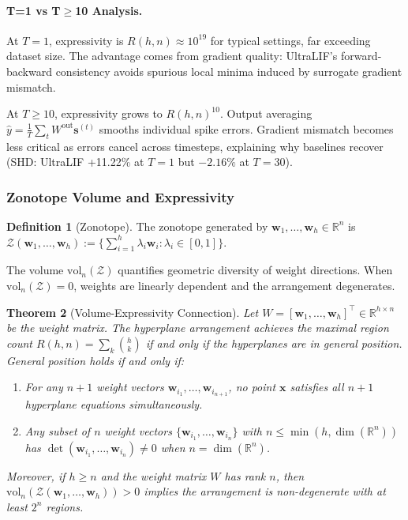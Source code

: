 \documentclass{article}
\theoremstyle{plain}
\newtheorem{theorem}{Theorem}[section]
\theoremstyle{definition}
\newtheorem{definition}[theorem]{Definition}
\theoremstyle{remark}
\begin{document}
\paragraph{T=1 vs T$\geq$10 Analysis.} At $T{=}1$, expressivity is $R(h,n) \approx 10^{19}$ for typical settings, far exceeding dataset size. The advantage comes from gradient quality: UltraLIF's forward-backward consistency avoids spurious local minima induced by surrogate gradient mismatch.

At $T{\geq}10$, expressivity grows to $R(h,n)^{10}$. Output averaging $\hat{y} = \frac{1}{T}\sum_t W^{\mathrm{out}}\mathbf{s}^{(t)}$ smooths individual spike errors. Gradient mismatch becomes less critical as errors cancel across timesteps, explaining why baselines recover (SHD: UltraLIF +11.22\% at $T{=}1$ but $-2.16\%$ at $T{=}30$).

\subsubsection{Zonotope Volume and Expressivity}
\label{app:zonotope}

\begin{definition}[Zonotope]
The zonotope generated by $\mathbf{w}_1, \ldots, \mathbf{w}_h \in \mathbb{R}^n$ is $\mathcal{Z}(\mathbf{w}_1, \ldots, \mathbf{w}_h) := \{\sum_{i=1}^h \lambda_i \mathbf{w}_i : \lambda_i \in [0,1]\}$.
\end{definition}

The volume $\mathrm{vol}_n(\mathcal{Z})$ quantifies geometric diversity of weight directions. When $\mathrm{vol}_n(\mathcal{Z}) = 0$, weights are linearly dependent and the arrangement degenerates.

\begin{theorem}[Volume-Expressivity Connection]
\label{thm:app-zonotope-expressivity}
Let $W = [\mathbf{w}_1, \ldots, \mathbf{w}_h]^\top \in \mathbb{R}^{h \times n}$ be the weight matrix. The hyperplane arrangement achieves the maximal region count $R(h,n) = \sum_k \binom{h}{k}$ if and only if the hyperplanes are in general position. General position holds if and only if:
\begin{enumerate}
\item For any $n{+}1$ weight vectors $\mathbf{w}_{i_1}, \ldots, \mathbf{w}_{i_{n+1}}$, no point $\mathbf{x}$ satisfies all $n{+}1$ hyperplane equations simultaneously.
\item Any subset of $n$ weight vectors $\{\mathbf{w}_{i_1}, \ldots, \mathbf{w}_{i_n}\}$ with $n \leq \min(h, \dim(\mathbb{R}^n))$ has $\det(\mathbf{w}_{i_1}, \ldots, \mathbf{w}_{i_n}) \neq 0$ when $n = \dim(\mathbb{R}^n)$.
\end{enumerate}
Moreover, if $h \geq n$ and the weight matrix $W$ has rank $n$, then $\mathrm{vol}_n(\mathcal{Z}(\mathbf{w}_1, \ldots, \mathbf{w}_h)) > 0$ implies the arrangement is non-degenerate with at least $2^n$ regions.
\end{theorem}
\end{document}
